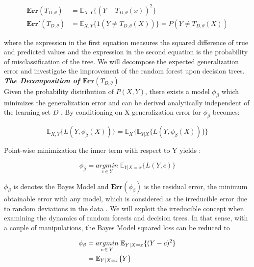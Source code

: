\begin{align}
	\boldsymbol{Err}(T_{D,\theta}) & = \mathbb{E}_{X,Y}\{ (Y - T_{D, \theta}(x))^2 \} \\
	\boldsymbol{Err'}(T_{D,\theta}) & = \mathbb{E}_{X,Y}\{ 1(Y \neq T_{D, \theta}(X)) \}
	= P(Y \neq T_{D, \theta}(X))
\end{align}

where the expression in the first equation measures the squared difference of true and predicted values
and the expression in the second equation is the probability of misclassification of the tree. 
We will decompose the expected generalization error and investigate the improvement of the random forest upon 
decision trees.
\vspace{2mm}
\\
\textbf{\emph{The Decomposition of $\boldsymbol{Err}(T_{D,\theta})$}}\\
Given the probability distribution of $P(X,Y)$, there exists a model $\phi_{\beta}$ which minimizes the generalization error 
and can be derived analytically independent of the learning set $D$ \cite{louppe2014understanding}. 
By conditioning on X generalization error for $\phi_{\beta}$ becomes:

\begin{equation}
\mathbb{E}_{X,Y} \{L(Y, \phi_{\beta}(X))\} = \mathbb{E}_{X}\{\mathbb{E}_{Y|X}\{L(Y, \phi_{\beta}(X)) \} \}
\end{equation}

Point-wise minimization the inner term with respect to Y yields \cite{louppe2014understanding}:

\begin{equation}
\phi_{\beta} = \underset{c \in Y}{argmin} \; \mathbb{E}_{Y|X=x}\{L(Y,c)\}
\end{equation}

$\phi_{\beta}$ is denotes the Bayes Model and $\boldsymbol{Err}(\phi_{\beta})$ is the residual error, 
the minimum obtainable error with any model, which is considered as the irreducible error due to random deviations in the 
data \cite{louppe2014understanding}. We will exploit the irreducible concept when examining the dynamics of random forests and 
decision trees. In that sense, with a couple of manipulations, the Bayes Model squared loss can be reduced to

\begin{align}
\phi_{\beta} & = \underset{c \,\in\, Y}{argmin} \; \mathbb{E}_{Y|X=x}\{(Y-c)^2 \} \notag\\
			 & = \mathbb{E}_{Y|X=x}\{Y\}
\end{align}

